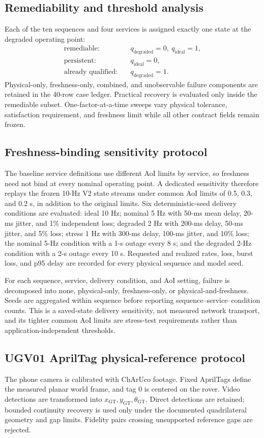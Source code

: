 \documentclass[journal,onecolumn]{IEEEtran}
\begin{document}
\subsection{Remediability and threshold analysis}
Each of the ten sequences and four services is assigned exactly one state at the degraded operating point:
\begin{align}
\text{remediable}:&\quad q_{\mathrm{degraded}}=0,\ q_{\mathrm{ideal}}=1,\\
\text{persistent}:&\quad q_{\mathrm{ideal}}=0,\\
\text{already qualified}:&\quad q_{\mathrm{degraded}}=1.
\end{align}
Physical-only, freshness-only, combined, and unobservable failure components are retained in the 40-row case ledger. Practical recovery is evaluated only inside the remediable subset. One-factor-at-a-time sweeps vary physical tolerance, satisfaction requirement, and freshness limit while all other contract fields remain frozen.

\subsection{Freshness-binding sensitivity protocol}
The baseline service definitions use different AoI limits by service, so freshness need not bind at every nominal operating point. A dedicated sensitivity therefore replays the frozen 10-Hz V2 state streams under common AoI limits of 0.5, 0.3, and 0.2 s, in addition to the original limits. Six deterministic-seed delivery conditions are evaluated: ideal 10 Hz; nominal 5 Hz with 50-ms mean delay, 20-ms jitter, and 1\% independent loss; degraded 2 Hz with 200-ms delay, 50-ms jitter, and 5\% loss; stress 1 Hz with 300-ms delay, 100-ms jitter, and 10\% loss; the nominal 5-Hz condition with a 1-s outage every 8 s; and the degraded 2-Hz condition with a 2-s outage every 10 s. Requested and realized rates, loss, burst loss, and p95 delay are recorded for every physical sequence and model seed.

For each sequence, service, delivery condition, and AoI setting, failure is decomposed into none, physical-only, freshness-only, or physical-and-freshness. Seeds are aggregated within sequence before reporting sequence--service--condition counts. This is a saved-state delivery sensitivity, not measured network transport, and its tighter common AoI limits are stress-test requirements rather than application-independent thresholds.

\subsection{UGV01 AprilTag physical-reference protocol}
The phone camera is calibrated with ChArUco footage. Fixed AprilTags define the measured planar world frame, and tag 0 is centered on the rover. Video detections are transformed into $x_{\mathrm{GT}},y_{\mathrm{GT}},\theta_{\mathrm{GT}}$. Direct detections are retained; bounded continuity recovery is used only under the documented quadrilateral geometry and gap limits. Fidelity pairs crossing unsupported reference gaps are rejected.
\end{document}
